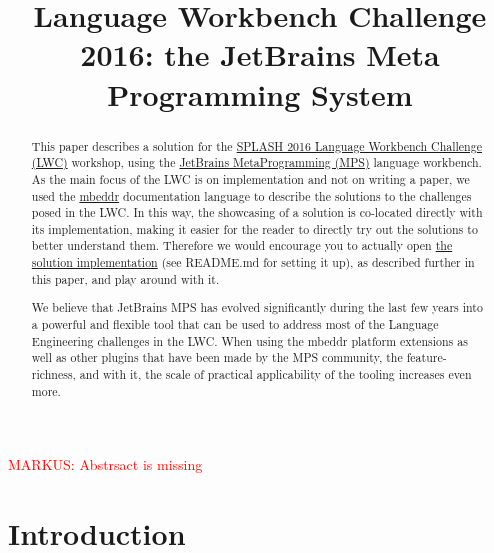 \documentclass[preprint,numbers,10pt]{sigplanconf}
\newcommand\markus[1]{\textcolor{red}{MARKUS: {#1}}}
\begin{document}
\title{Language Workbench Challenge 2016: the JetBrains Meta Programming System}

\maketitle

\begin{abstract}
    This paper describes a solution for the \href{http://2016.splashcon.org/track/lwc2016}{SPLASH 2016 Language Workbench Challenge (LWC)} workshop, using the \href{https://www.jetbrains.com/mps/}{JetBrains MetaProgramming (MPS)} language workbench.
	As the main focus of the LWC is on implementation and not on writing a paper, we used the \href{http://mbeddr.com/}{mbeddr} documentation language to describe the solutions to the challenges posed in the LWC. In this way, the showcasing of a solution is co-located directly with its implementation, making it easier for the reader to directly try out the solutions to better understand them. Therefore we would encourage you to actually open \href{https://github.com/mps-lwc-16/mps-lwc-16}{the solution implementation} (see README.md for setting it up), as described further in this paper, and play around with it.
	
	We believe that JetBrains MPS has evolved significantly during the last few years into a powerful and flexible tool that can be used to address most of the Language Engineering challenges in the LWC. When using the mbeddr platform extensions as well as other plugins that have been made by the MPS community, the feature-richness, and with it, the scale of practical applicability of the tooling increases even more.
\end{abstract}
%
%

\markus{Abstrsact is missing}

\section{Introduction}
\end{document}
